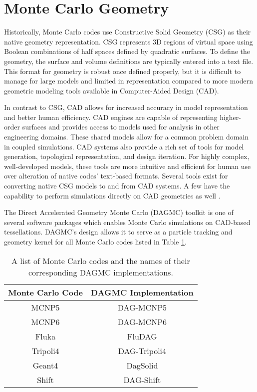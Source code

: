 \section{Monte Carlo Geometry}


Historically, Monte Carlo codes use Constructive Solid Geometry (CSG) as their
native geometry representation. CSG represents 3D regions of virtual
space using Boolean combinations of half spaces defined by quadratic
surfaces. To define the geometry, the surface and volume definitions are typically entered
into a text file. This format for geometry is robust once defined properly, but it is difficult to manage for large models and
limited in representation compared to more modern geometric modeling tools
available in Computer-Aided Design (CAD).

In contrast to CSG, CAD allows for increased accuracy in model representation and better human
efficiency. CAD engines are capable of representing higher-order surfaces and provides access
to models used for analysis in other engineering domains. These shared models
allow for a common problem domain in coupled simulations. CAD systems also
provide a rich set of tools for model generation, topological representation,
and design iteration. For highly complex, well-developed models, these tools are
more intuitive and efficient for human use over alteration of native codes' text-based
formats. Several tools exist for converting native CSG models to and from CAD
systems. A few have the capability to perform simulations directly on CAD
geometries as well \cite{Leppanen_2015}.

The Direct Accelerated Geometry Monte Carlo (DAGMC) \cite{Tautges_2009} toolkit
is one of several software packages which enables Monte Carlo simulations on
CAD-based tessellations. DAGMC's design allows it to serve as a particle tracking
and geometry kernel for all Monte Carlo codes listed
in Table \ref{tab:dagmc_implementations}.

\begin{table}[H]
  \centering
  \begin{tabular}{c c}
    \hline
    Monte Carlo Code & DAGMC Implementation \\
    \hline
    MCNP5\cite{LANL_MCNP5_VOLIII}            & DAG-MCNP5            \\
    MCNP6\cite{Goorley_2016}                 & DAG-MCNP6            \\
    Fluka\cite{Bohlen_2014}                  & FluDAG               \\
    Tripoli4\cite{Malouch_2017}              & DAG-Tripoli4         \\
    Geant4\cite{GEANT4_2003}                 & DagSolid             \\
    Shift\cite{Pandya_2016}                  & DAG-Shift            \\
    \hline
  \end{tabular}
  \caption[A list of Monte Carlo codes supported by DAGMC.]{A list of Monte Carlo codes and the names of their corresponding DAGMC implementations.}
  \label{tab:dagmc_implementations}
\end{table}

